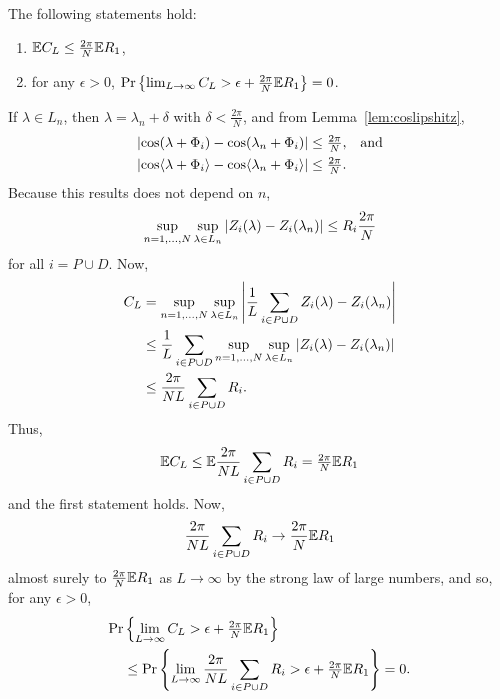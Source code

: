 \documentclass[journal]{IEEEtran}
\begin{document}
\begin{lemma}\label{lem:CL} The following statements hold:
\begin{enumerate}
\item ${\mathbb E} C_L \leq \tfrac{2\pi}{N}{\mathbb E} R_1$,
\item for any $\epsilon > 0$, ${\operatorname{Pr}}\left\{ \lim_{L \rightarrow \infty} C_L > \epsilon + \tfrac{2\pi}{N}{\mathbb E} R_1 \right\} = 0$.
\end{enumerate}
\end{lemma}
\begin{IEEEproof}
If $\lambda \in L_n$, then $\lambda = \lambda_n + \delta$ with $\delta < \tfrac{2\pi}{N}$, and from Lemma~\ref{lem:coslipshitz},
\begin{align*}
&{\left\vert \cos(\lambda + \Phi_i) - \cos(\lambda_n + \Phi_i) \right\vert} \leq \tfrac{2\pi}{N}, \;\;\; \text{and} \\
&{\left\vert \cos\langle \lambda + \Phi_i \rangle - \cos\langle \lambda_n + \Phi_i \rangle \right\vert} \leq \tfrac{2\pi}{N}.
\end{align*}
Because this results does not depend on $n$,
\[
\sup_{n=1,\dots,N}\sup_{\lambda \in L_n} {\left\vert Z_i(\lambda) - Z_i(\lambda_n) \right\vert} \leq R_i \frac{2\pi}{N}
\]
for all $i = P \cup D$.  Now,
\begin{align*}
C_L &= \sup_{n=1,\dots,N}\sup_{\lambda \in L_n}{\left\vert \frac{1}{L}\sum_{i \in P \cup D} Z_i(\lambda) - Z_i(\lambda_n) \right\vert} \\
&\leq \frac{1}{L}\sum_{i \in P \cup D} \sup_{n=1,\dots,N}\sup_{\lambda \in L_n} {\left\vert Z_i(\lambda) - Z_i(\lambda_n) \right\vert} \\
&\leq \frac{2\pi}{N L}\sum_{i \in P \cup D} R_i .
\end{align*}
Thus, 
\[
{\mathbb E} C_L \leq {\mathbb E} \frac{2\pi}{N L}\sum_{i \in P \cup D} R_i = \tfrac{2\pi}{N}{\mathbb E} R_1
\]
and the first statement holds.  Now, 
\[
\frac{2\pi}{N L}\sum_{i \in P \cup D} R_i \rightarrow \frac{2\pi}{N}{\mathbb E} R_1
\] 
almost surely to $\frac{2\pi}{N}{\mathbb E} R_1$ as $L \rightarrow\infty$ by the strong law of large numbers, and so, for any $\epsilon > 0$,
\begin{align*}
{\operatorname{Pr}}&\left\{ \lim_{L \rightarrow \infty} C_L > \epsilon + \tfrac{2\pi}{N}{\mathbb E} R_1 \right\} \\
&\leq {\operatorname{Pr}}\left\{ \lim_{L \rightarrow \infty} \frac{2\pi}{N L}\sum_{i \in P \cup D} R_i > \epsilon + \tfrac{2\pi}{N}{\mathbb E} R_1 \right\} = 0.
\end{align*}
\end{IEEEproof}
\end{document}
